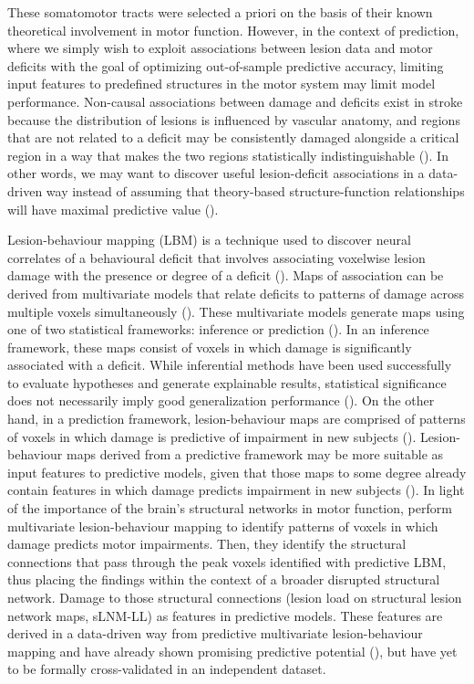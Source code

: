 \documentclass[phd,tocprelim]{cornell}
\begin{document}
These somatomotor tracts were selected a priori on the basis of their known theoretical involvement in motor function. However, in the context of prediction, where we simply wish to exploit associations between lesion data and motor deficits with the goal of optimizing out-of-sample predictive accuracy, limiting input features to predefined structures in the motor system may limit model performance. Non-causal associations between damage and deficits exist in stroke because the distribution of lesions is influenced by vascular anatomy, and regions that are not related to a deficit may be consistently damaged alongside a critical region in a way that makes the two regions statistically indistinguishable (\cite{Mah2014-cb}). In other words, we may want to discover useful lesion-deficit associations in a data-driven way instead of assuming that theory-based structure-function relationships will have maximal predictive value (\cite{Bzdok2020-py, Bonkhoff2022-op}).

Lesion-behaviour mapping (LBM) is a technique used to discover neural correlates of a behavioural deficit that involves associating voxelwise lesion damage with the presence or degree of a deficit (\cite{Bates2003-eg,Karnath2020-cg}). Maps of association can be derived from multivariate models that relate deficits to patterns of damage across multiple voxels simultaneously (\cite{Ivanova2021-nh, Karnath2020-cg, Zhang2014-jd, Sperber2019-tu}). These multivariate models generate maps using one of two statistical frameworks: inference or prediction (\cite{Sperber2022-oj, Bzdok2020-py}). In an inference framework, these maps consist of voxels in which damage is significantly associated with a deficit. While inferential methods have been used successfully to evaluate hypotheses and generate explainable results, statistical significance does not necessarily imply good generalization performance (\cite{Bzdok2020-py}). On the other hand, in a prediction framework, lesion-behaviour maps are comprised of patterns of voxels in which damage is predictive of impairment in new subjects (\cite{Bowren2022-rs, Mah2014-cb,Rondina2017-ij, Sperber2020-kp}). Lesion-behaviour maps derived from a predictive framework may be more suitable as input features to predictive models, given that those maps to some degree already contain features in which damage predicts impairment in new subjects (\cite{Zhang2014-jd}). In light of the importance of the brain's structural networks in motor function, \cite{Bowren2022-rs} perform multivariate lesion-behaviour mapping to identify patterns of voxels in which damage predicts motor impairments. Then, they identify the structural connections that pass through the peak voxels identified with predictive LBM, thus placing the findings within the context of a broader disrupted structural network. Damage to those structural connections (lesion load on structural lesion network maps, sLNM-LL) as features in predictive models. These features are derived in a data-driven way from predictive multivariate lesion-behaviour mapping and have already shown promising predictive potential (\cite{Bowren2022-rs}), but have yet to be formally cross-validated in an independent dataset. 
\end{document}
